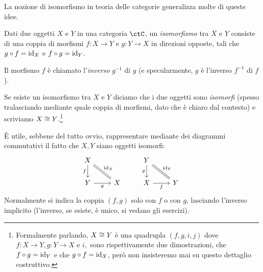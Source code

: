 La nozione di isomorfismo in teoria delle categorie generalizza molte di queste idee.
\begin{definition}[Isomorfismo]\label{def_isomorfismo}
	Dati due oggetti \(X\) e \(Y\) in una categoria \(\ctC\), un \emph{isomorfismo} tra \(X\) e \(Y\) consiste di una coppia di morfismi \(f:X\to Y\) e \(g:Y\to X\) in direzioni opposte, tali che \(g\circ f=\mathrm{id}_X\) e \(f\circ g=\mathrm{id}_Y\).

	Il morfismo \(f\) è chiamato l'\emph{inverso} \(g^{-1}\) di \(g\) (e specularmente, \(g\) è l'inverso \(f^{-1}\) di \(f\)).

	Se esiste un isomorfismo tra \(X\) e \(Y\) diciamo che i due oggetti sono \emph{isomorfi} (spesso tralasciando mediante quale coppia di morfismi, dato che è chiaro dal contesto) e scriviamo \(X\cong Y\).\footnote{Formalmente parlando, \(X\cong Y\) è una quadrupla \((f,g, i,j)\) dove \(f : X\to Y, g: Y\to X\) e \(i,\) sono rispettivamente due dimostrazioni, che \(f\circ g= \mathrm{id}_Y\) e che \(g\circ f=\mathrm{id}_X\), però non insisteremo mai su questo dettaglio costruttivo.}
\end{definition}
\`E utile, sebbene del tutto ovvio, rappresentare mediante dei diagrammi commutativi il fatto che \(X,Y\) siano oggetti isomorfi: %
\[
	\begin{tikzcd}
		X\ar[d, "f"'] \ar[dr, equal, "\id_X"]& & Y \ar[dr, equal, "\id_Y"]\ar[d,"g"']\\
		Y \ar[r, "g"']& X & X \ar[r, "f"']& Y
	\end{tikzcd}
\]
Normalmente si indica la coppia \((f,g)\) solo con \(f\) o con \(g\), lasciando l'inverso implicito (l'inverso, se esiste, è unico, si vedano gli esercizi).
